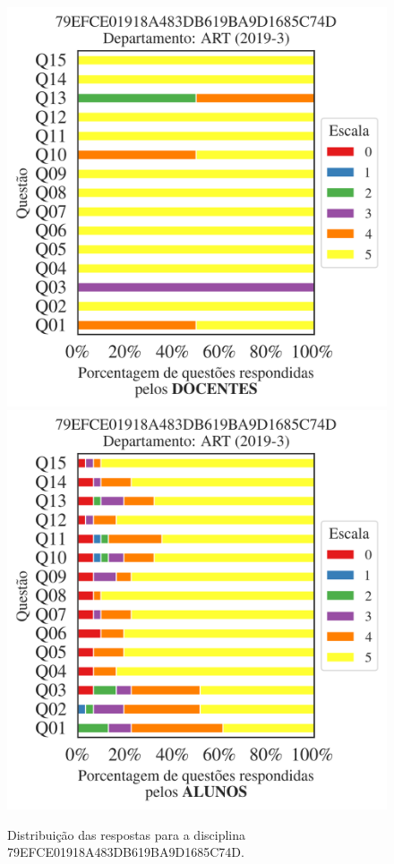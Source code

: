 \documentclass[a4paper,10pt]{article}
\begin{document}
\begin{figure}[h]
\centering
\includegraphics[width=0.485\linewidth]{analise_disciplina_departamento_ART_79EFCE01918A483DB619BA9D1685C74D_docentes.png}
\includegraphics[width=0.485\linewidth]{analise_disciplina_departamento_ART_79EFCE01918A483DB619BA9D1685C74D_alunos.png}
\caption{\label{fig:analise_geral_departamento}                Distribuição das respostas para a disciplina 79EFCE01918A483DB619BA9D1685C74D. }
\end{figure}
\end{document}
